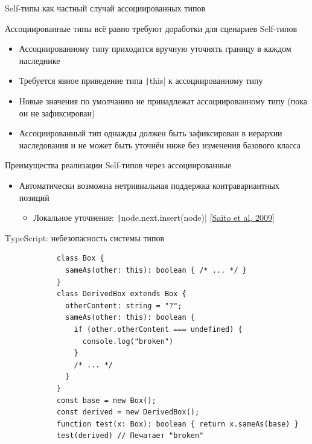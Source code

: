 \documentclass[usenames, dvipsnames]{beamer}
\begin{document}
    \begin{frame}[fragile]{Self-типы как частный случай ассоциированных типов}
        \begin{block}{Ассоциированные типы всё равно требуют доработки для сценариев Self-типов}
            \begin{itemize}
                \item Ассоциированному типу приходится вручную уточнять границу в каждом наследнике
                \item Требуется явное приведение типа \texttt|this| к ассоциированному типу
                \item Новые значения по умолчанию не принадлежат ассоциированному типу (пока он не зафиксирован)
                \item Ассоциированный тип однажды должен быть зафиксирован в иерархии наследования и не может быть уточнён ниже без изменения базового класса
            \end{itemize}
        \end{block}

        \begin{block}{Преимущества реализации Self-типов через ассоциированные}
            \begin{itemize}
                \item Автоматически возможна нетривиальная поддержка контравариантных позиций
                \begin{itemize}
                    \item Локальное уточнение: \texttt|node.next.insert(node)| [\href{http://www.fos.kuis.kyoto-u.ac.jp/~igarashi/papers/pdf/thistype-SAC09.pdf}{Saito et al, 2009}]
                \end{itemize}
            \end{itemize}
        \end{block}
    \end{frame}

    \begin{frame}[fragile]{TypeScript: небезопасность системы типов}
        \begin{verbatim}
            class Box {
              sameAs(other: this): boolean { /* ... */ }
            }
            class DerivedBox extends Box {
              otherContent: string = "?";
              sameAs(other: this): boolean {
                if (other.otherContent === undefined) {
                  console.log("broken")
                }
                /* ... */
              }
            }
            const base = new Box();
            const derived = new DerivedBox();
            function test(x: Box): boolean { return x.sameAs(base) }
            test(derived) // Печатает "broken"
        \end{verbatim}
    \end{frame}
\end{document}
